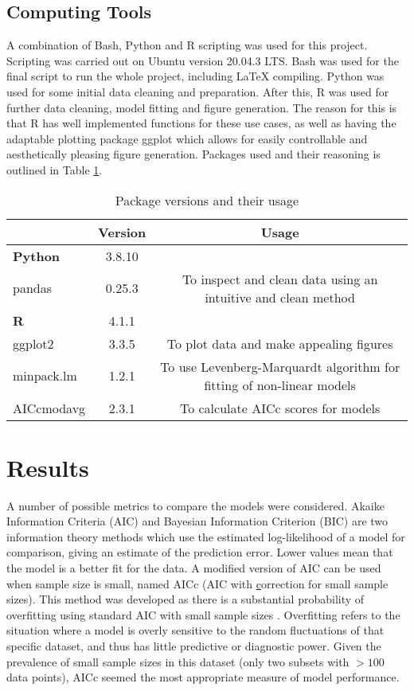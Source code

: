 \documentclass[11pt,a4wide,titlepage]{article}
\begin{document}
\subsection*{Computing Tools}
A combination of Bash, Python and R scripting was used for this project. Scripting was carried out on Ubuntu version 20.04.3 LTS. Bash was used for the final script to run the whole project, including LaTeX compiling. Python was used for some initial data cleaning and preparation. After this, R was used for further data cleaning, model fitting and figure generation. The reason for this is that R has well implemented functions for these use cases, as well as having the adaptable plotting package ggplot which allows for easily controllable and aesthetically pleasing figure generation. Packages used and their reasoning is outlined in Table \ref{packages}.


\begin{table}
\begin{center}
	\caption{Package versions and their usage}\label{packages}
	\def\arraystretch{1.5}
\begin{tabular}{|l|c|c|}
	\hline
	& Version & Usage\\
	\hline
	\textbf{Python} & 3.8.10 & \\
	\indent pandas & 0.25.3 & To inspect and clean data using an intuitive and clean method\\
	\hline
	\textbf{R} & 4.1.1 & \\
	\indent ggplot2 & 3.3.5 & To plot data and make appealing figures\\
	\indent minpack.lm & 1.2.1 & To use Levenberg-Marquardt algorithm for fitting of non-linear models\\
	\indent AICcmodavg & 2.3.1 & To calculate AICc scores for models\\
	\hline
\end{tabular}
\end{center}
\end{table}


\section*{Results}
A number of possible metrics to compare the models were considered. Akaike Information Criteria (AIC) and Bayesian Information Criterion (BIC) are two information theory methods which use the estimated log-likelihood of a model for comparison, giving an estimate of the prediction error. Lower values mean that the model is a better fit for the data. A modified version of AIC can be used when sample size is small, named AICc (AIC with \underline{c}orrection for small sample sizes). This method was developed as there is a substantial probability of overfitting using standard AIC with small sample sizes \citep{johnsonModelSelectionEcology2004}. Overfitting refers to the situation where a model is overly sensitive to the random fluctuations of that specific dataset, and thus has little predictive or diagnostic power. Given the prevalence of small sample sizes in this dataset (only two subsets with $>100$ data points), AICc seemed the most appropriate measure of model performance.
\end{document}
